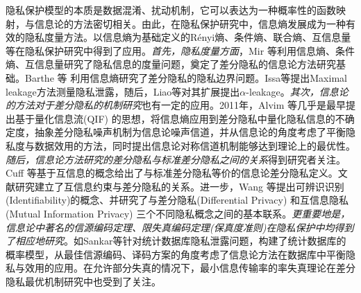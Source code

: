 隐私保护模型的本质是数据混淆、扰动机制，它可以表达为一种概率性的函数映射，与信息论的方法密切相关\cite{Duchi2019information}。由此，在隐私保护研究中，信息熵发展成为一种有效的隐私度量方法\cite{issa2016an,Chatzikokolakis2008Anonymity}。以信息熵为基础定义的R\'{e}nyi熵\cite{renyi1961on,erven2014renyi,mironov2017renyi}、条件熵、联合熵、互信息量等在隐私保护研究中得到了应用\cite{wang2019consistent,mcgregor2010the,du2015Fundamental,lopuhaa-zwakenberg2019information}。{\em 首先，隐私度量方面}，Mir 等\cite{mir2012information}利用信息熵、条件熵、互信息量研究了隐私信息的度量问题，奠定了差分隐私的信息论方法研究基础。Barthe 等\cite{barthe2011information} 利用信息熵研究了差分隐私的隐私边界问题。Issa等\cite{issa2016an,2016Maximal}提出Maximal leakage方法测量隐私泄露，随后，Liao等\cite{liao2019tunable}对其扩展提出$\alpha$-leakage。{\em 其次，信息论的方法对于差分隐私的机制研究}也有一定的应用\cite{diaz2020on,kairouz2016extremal,wang2016on}。2011年，Alvim 等\cite{alvim2011differential,alvim2011on,alvim2015on}几乎是最早提出基于量化信息流(QIF) 的思想，将信息熵应用到差分隐私中量化隐私信息的不确定度，抽象差分隐私噪声机制为信息论噪声信道，并从信息论的角度考虑了平衡隐私度与数据效用的方法，同时提出信息论对称信道机制能够达到理论上的最优性。{\em 随后，信息论方法研究的差分隐私与标准差分隐私之间的关系}得到研究者关注\cite{mcgregor2010the}。Cuff 等\cite{cuff2016differential}基于互信息的概念给出了与标准差分隐私等价的信息论差分隐私定义。文献研究建立了互信息约束与差分隐私的关系。进一步，Wang 等\cite{wang2016on}提出可辨识识别(Identifiability)的概念、并研究了与差分隐私(Differential Privacy) 和互信息隐私(Mutual Information Privacy) 三个不同隐私概念之间的基本联系。{\em 更重要地是，信息论中著名的信源编码定理、限失真编码定理(保真度准则)}\cite{cover2006elements}{\em 在隐私保护中均得到了相应地研究}\cite{rebollo-monedero2010from,du2015Fundamental}。如Sankar等\cite{sankar2013utility}针对统计数据库隐私泄露问题，构建了统计数据库的概率模型，从最佳信源编码、译码方案的角度考虑了信息论方法在数据库中平衡隐私与效用的应用。在允许部分失真的情况下，最小信息传输率的率失真理论在差分隐私\cite{mir2012information,wang2016on}最优机制研究中也受到了关注。

